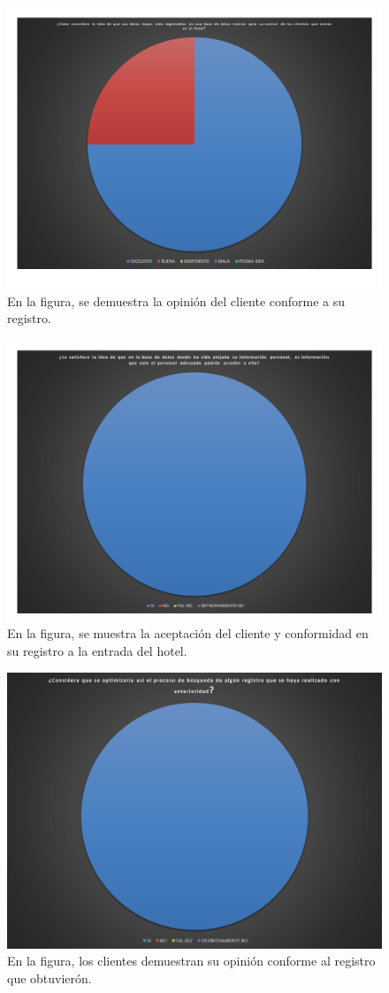 \documentclass[a4paper,10pt]{report}
\begin{document}
\begin{figure}[H]
\centering
\includegraphics[scale=.7]{imagenes/Diapositiva7.PNG}
\caption{En la figura, se demuestra la opinión del cliente conforme a su registro. }
\end{figure}

\begin{figure}[H]
\centering
\includegraphics[scale=.7]{imagenes/Diapositiva8.PNG}
\caption{En la figura, se muestra la aceptación del cliente y conformidad en su registro a la entrada del hotel. }
\end{figure}

\begin{figure}[H]
\centering
\includegraphics[scale=.7]{imagenes/Diapositiva9.png}
\caption{En la figura, los clientes demuestran su opinión conforme al registro que obtuvierón. }
\end{figure}
\end{document}
